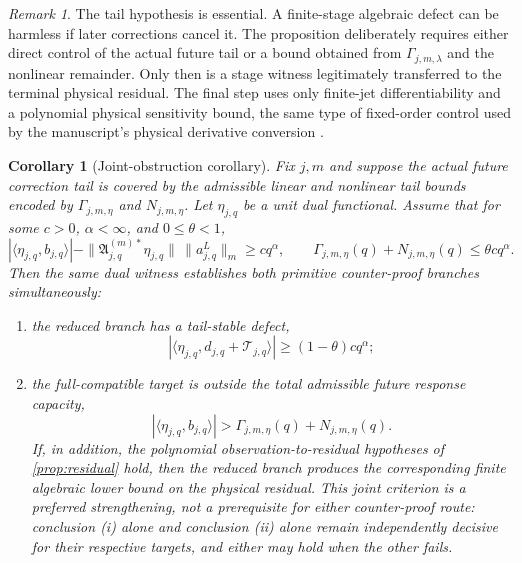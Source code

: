\documentclass[12pt]{article}
\theoremstyle{plain}
\newtheorem{corollary}[theorem]{Corollary}
\theoremstyle{definition}
\theoremstyle{remark}
\newtheorem{remark}[theorem]{Remark}
\newcommand{\Comp}{\mathfrak A}
\newcommand{\Tail}{\mathscr T}
\begin{document}
\begin{remark}
The tail hypothesis is essential. A finite-stage algebraic defect can be harmless if later corrections cancel it. The proposition deliberately requires either direct control of the actual future tail or a bound obtained from \(\Gamma_{j,m,\lambda}\) and the nonlinear remainder. Only then is a stage witness legitimately transferred to the terminal physical residual. The final step uses only finite-jet differentiability and a polynomial physical sensitivity bound, the same type of fixed-order control used by the manuscript's physical derivative conversion \cite{RobinsonRodrigoSadowski2016,OpenAI2026}.
\end{remark}

\begin{corollary}[Joint-obstruction corollary]\label{cor:joint-obstruction}
Fix \(j,m\) and suppose the actual future correction tail is covered by the admissible linear and nonlinear tail bounds encoded by \(\Gamma_{j,m,\eta}\) and \(N_{j,m,\eta}\). Let \(\eta_{j,q}\) be a unit dual functional. Assume that for some \(c>0\), \(\alpha<\infty\), and \(0\le\theta<1\),
\[
|\langle\eta_{j,q},b_{j,q}\rangle|
-\|\Comp_{j,q}^{(m)*}\eta_{j,q}\|\,\|a^L_{j,q}\|_m
\ge c q^\alpha,
\qquad
\Gamma_{j,m,\eta}(q)+N_{j,m,\eta}(q)
\le\theta c q^\alpha.
\]
Then the same dual witness establishes both primitive counter-proof branches simultaneously:
\begin{enumerate}[label=(\roman*),leftmargin=2.2em,itemsep=0.25em]
\item the reduced branch has a tail-stable defect,
\[
|\langle\eta_{j,q},d_{j,q}+\Tail_{j,q}\rangle|
\ge (1-\theta)cq^\alpha;
\]
\item the full-compatible target is outside the total admissible future response capacity,
\[
|\langle\eta_{j,q},b_{j,q}\rangle|
>\Gamma_{j,m,\eta}(q)+N_{j,m,\eta}(q).
\]
If, in addition, the polynomial observation-to-residual hypotheses of \cref{prop:residual} hold, then the reduced branch produces the corresponding finite algebraic lower bound on the physical residual. This joint criterion is a preferred strengthening, not a prerequisite for either counter-proof route: conclusion (i) alone and conclusion (ii) alone remain independently decisive for their respective targets, and either may hold when the other fails.
\end{enumerate}
\end{corollary}
\end{document}

